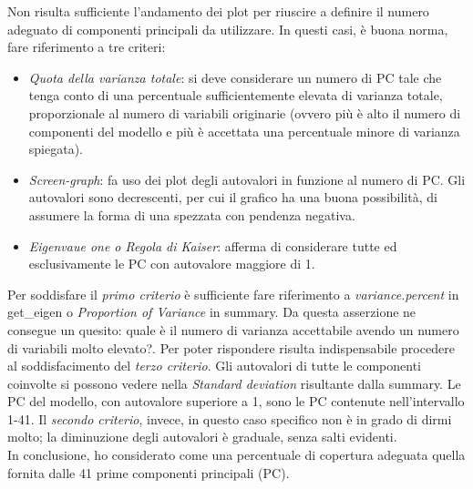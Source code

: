\noindent
Non risulta sufficiente l'andamento dei plot per riuscire a definire il numero adeguato di componenti principali da utilizzare. In questi casi, \`e buona norma, fare riferimento a tre criteri:
\begin{itemize}
\item \textit{Quota della varianza totale}: si deve considerare un numero di PC tale che tenga conto di una percentuale sufficientemente elevata di varianza totale, proporzionale al numero di variabili originarie (ovvero pi\`u \`e alto il numero di componenti del modello e pi\`u \`e accettata una percentuale minore di varianza spiegata).
\item \textit{Screen-graph}: fa uso dei plot degli autovalori in funzione al numero di PC. Gli autovalori sono decrescenti, per cui il grafico ha una buona possibilit\`a, di assumere la forma di una spezzata con pendenza negativa.
\item \textit{Eigenvaue one o Regola di Kaiser}: afferma di considerare tutte ed esclusivamente le PC con autovalore maggiore di 1.
\end{itemize}
\noindent
Per soddisfare il \textit{primo criterio} \`e sufficiente fare riferimento a \textit{variance.percent} in get\_eigen o \textit{Proportion of Variance} in summary. Da questa asserzione ne consegue un quesito: quale \`e il numero di varianza accettabile avendo un numero di variabili molto elevato?.
Per poter rispondere risulta indispensabile procedere al soddisfacimento del \textit{terzo criterio}. Gli autovalori di tutte le componenti coinvolte si possono vedere nella \textit{Standard deviation} risultante dalla summary. Le PC del modello, con autovalore superiore a 1, sono le PC contenute nell'intervallo 1-41.
Il \textit{secondo criterio}, invece, in questo caso specifico non \`e in grado di dirmi molto; la diminuzione degli autovalori \`e graduale, senza salti evidenti.\\
In conclusione, ho considerato come una percentuale di copertura adeguata quella fornita dalle 41 prime componenti principali (PC).
